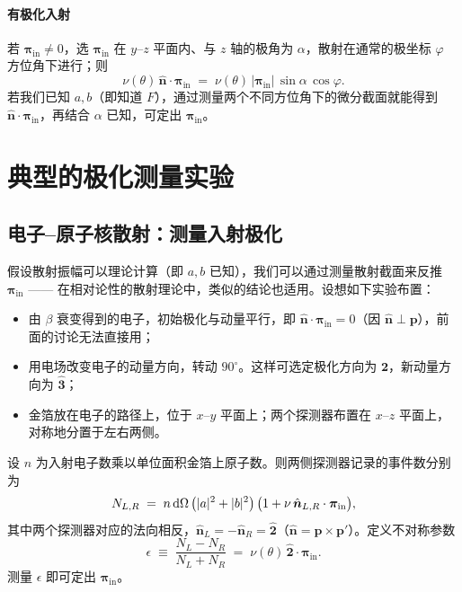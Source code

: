 \paragraph{有极化入射}
若 $\bm{\pi}_{\text{in}}\neq 0$，选 $\bm{\pi}_{\text{in}}$ 在 $y$–$z$ 平面内、与 $z$ 轴的极角为 $\alpha$，散射在通常的极坐标 $\varphi$ 方位角下进行；则
\begin{equation}
  \nu(\theta)\,\hat{\bm n}\cdot\bm{\pi}_{\text{in}}
  \;=\; \nu(\theta)\,|\bm{\pi}_{\text{in}}|\,\sin\alpha\,\cos\varphi.
  \label{eq:nu-n-pi}
\end{equation}
若我们已知 $a,b$（即知道 $F$），通过测量两个不同方位角下的微分截面就能得到 $\hat{\bm n}\cdot\bm{\pi}_{\text{in}}$，再结合 $\alpha$ 已知，可定出 $\bm{\pi}_{\text{in}}$。

\section{典型的极化测量实验}

\subsection{电子–原子核散射：测量入射极化}

假设散射振幅可以理论计算（即 $a,b$ 已知），我们可以通过测量散射截面来反推 $\bm{\pi}_{\text{in}}$ —— 在相对论性的散射理论中，类似的结论也适用。设想如下实验布置：
\begin{itemize}
  \item 由 $\beta$ 衰变得到的电子，初始极化与动量平行，即 $\hat{\bm n}\cdot\bm{\pi}_{\text{in}}=0$（因 $\hat{\bm n}\perp\bm p$），前面的讨论无法直接用；
  \item 用电场改变电子的动量方向，转动 $90^\circ$。这样可选定极化方向为 $\hat{\bm 2}$，新动量方向为 $\hat{\bm 3}$；
  \item 金箔放在电子的路径上，位于 $x$–$y$ 平面上；两个探测器布置在 $x$–$z$ 平面上，对称地分置于左右两侧。
\end{itemize}

设 $n$ 为入射电子数乘以单位面积金箔上原子数。则两侧探测器记录的事件数分别为
\[
  N_{L,R} \;=\; n\,\mathrm{d}\Omega\,\big(|a|^2+|b|^2\big)\,\big(1 + \nu\,\hat{\bm n}_{L,R}\cdot\bm{\pi}_{\text{in}}\big),
\]
其中两个探测器对应的法向相反，$\hat{\bm n}_L=-\hat{\bm n}_R=\hat{\bm 2}$（$\hat{\bm n}=\bm p\times\bm p'$）。定义不对称参数
\begin{equation}
  \epsilon \;\equiv\; \frac{N_L - N_R}{N_L + N_R} \;=\; \nu(\theta)\,\hat{\bm 2}\cdot\bm{\pi}_{\text{in}}.
  \label{eq:asym}
\end{equation}
测量 $\epsilon$ 即可定出 $\bm{\pi}_{\text{in}}$。

